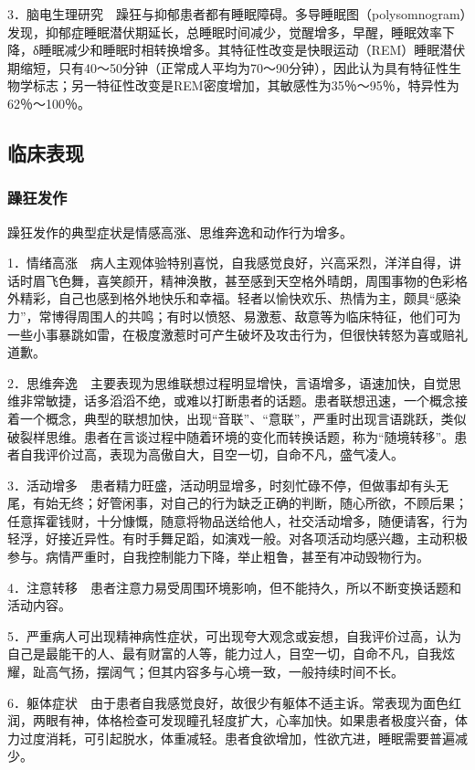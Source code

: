 3．脑电生理研究　躁狂与抑郁患者都有睡眠障碍。多导睡眠图（polysomnogram）发现，抑郁症睡眠潜伏期延长，总睡眠时间减少，觉醒增多，早醒，睡眠效率下降，δ睡眠减少和睡眠时相转换增多。其特征性改变是快眼运动（REM）睡眠潜伏期缩短，只有40～50分钟（正常成人平均为70～90分钟），因此认为具有特征性生物学标志；另一特征性改变是REM密度增加，其敏感性为35％～95％，特异性为62％～100％。

\subsection{临床表现}

\subsubsection{躁狂发作}

躁狂发作的典型症状是情感高涨、思维奔逸和动作行为增多。

1．情绪高涨　病人主观体验特别喜悦，自我感觉良好，兴高采烈，洋洋自得，讲话时眉飞色舞，喜笑颜开，精神涣散，甚至感到天空格外晴朗，周围事物的色彩格外精彩，自己也感到格外地快乐和幸福。轻者以愉快欢乐、热情为主，颇具``感染力''，常博得周围人的共鸣；有时以愤怒、易激惹、敌意等为临床特征，他们可为一些小事暴跳如雷，在极度激惹时可产生破坏及攻击行为，但很快转怒为喜或赔礼道歉。

2．思维奔逸　主要表现为思维联想过程明显增快，言语增多，语速加快，自觉思维非常敏捷，话多滔滔不绝，或难以打断患者的话题。患者联想迅速，一个概念接着一个概念，典型的联想加快，出现``音联''、``意联''，严重时出现言语跳跃，类似破裂样思维。患者在言谈过程中随着环境的变化而转换话题，称为``随境转移''。患者自我评价过高，表现为高傲自大，目空一切，自命不凡，盛气凌人。

3．活动增多　患者精力旺盛，活动明显增多，时刻忙碌不停，但做事却有头无尾，有始无终；好管闲事，对自己的行为缺乏正确的判断，随心所欲，不顾后果；任意挥霍钱财，十分慷慨，随意将物品送给他人，社交活动增多，随便请客，行为轻浮，好接近异性。有时手舞足蹈，如演戏一般。对各项活动均感兴趣，主动积极参与。病情严重时，自我控制能力下降，举止粗鲁，甚至有冲动毁物行为。

4．注意转移　患者注意力易受周围环境影响，但不能持久，所以不断变换话题和活动内容。

5．严重病人可出现精神病性症状，可出现夸大观念或妄想，自我评价过高，认为自己是最能干的人、最有财富的人等，能力过人，目空一切，自命不凡，自我炫耀，趾高气扬，摆阔气；但其内容多与心境一致，一般持续时间不长。

6．躯体症状　由于患者自我感觉良好，故很少有躯体不适主诉。常表现为面色红润，两眼有神，体格检查可发现瞳孔轻度扩大，心率加快。如果患者极度兴奋，体力过度消耗，可引起脱水，体重减轻。患者食欲增加，性欲亢进，睡眠需要普遍减少。

